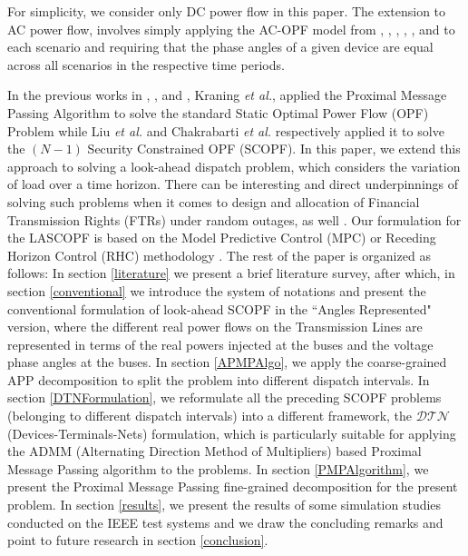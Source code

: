 \documentclass[preprint,12pt,3p]{elsarticle}
\begin{document}
	For simplicity, we consider only DC power flow in this paper.  The extension to AC power flow, involves simply applying the AC-OPF model from \cite{BWW:08}, \cite{LL:12}, \cite{SL:12a}, \cite{SL:12b}, \cite{LTZ:12}, and \cite{E:14} to each scenario and requiring that the phase angles of a given device are equal across all scenarios in the respective time periods. 
	
	In the previous works in \cite{KC:13}, \cite{LKWZ:13}, and \cite{CK:14}, Kraning \emph{et al.}, applied the Proximal Message Passing Algorithm to solve the standard Static Optimal Power Flow (OPF) Problem while Liu \emph{et al.} and Chakrabarti \emph{et al.} respectively applied it to solve the $(N-1)$ Security Constrained OPF (SCOPF). In this paper, we extend this approach to solving a look-ahead dispatch problem, which considers the variation of load over a time horizon. There can be interesting and direct underpinnings of solving such problems when it comes to design and allocation of Financial Transmission Rights (FTRs) under random outages, as well \cite{SamMo2018}. Our formulation for the LASCOPF is based on the Model Predictive Control (MPC) or Receding Horizon Control (RHC) methodology \cite{QB:03,CTHK:03,Her:05,TR:04,KW:11}. The rest of the paper is organized as follows: In section \ref{literature} we present a brief literature survey, after which, in section \ref{conventional} we introduce the system of notations and present the conventional formulation of look-ahead SCOPF in the ``Angles Represented" version, where the different real power flows on the Transmission Lines are represented in terms of the real powers injected at the buses and the voltage phase angles at the buses. In section \ref{APMPAlgo}, we apply the coarse-grained APP decomposition to split the problem into different dispatch intervals. In section \ref{DTNFormulation}, we reformulate all the preceding SCOPF problems (belonging to different dispatch intervals) into a different framework, the $\mathcal{DTN}$ (Devices-Terminals-Nets) formulation, which is particularly suitable for applying the ADMM (Alternating Direction Method of Multipliers) \cite{BP:11} based Proximal Message Passing algorithm to the problems. In section \ref{PMPAlgorithm}, we present the Proximal Message Passing fine-grained decomposition for the present problem. In section \ref{results}, we present the results of some simulation studies conducted on the IEEE test systems and we draw the concluding remarks and point to future research in section \ref{conclusion}.
	
\end{document}
